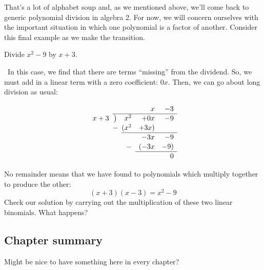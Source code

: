 That's a lot of alphabet soup and, as we mentioned above, we'll come back to generic polynomial division in algebra 2. For now, we will concern ourselves with the important situation in which one polynomial is a factor of another. Consider this final example as we make the transition.

\begin{boxedex}
Divide $x^2-9$ by $x+3$.

\exsoln\ In this case, we find that there are terms ``missing'' from the dividend. So, we must add in a linear term with a zero coefficient: $0x$. Then, we can go about long division as usual:

\[
\renewcommand\arraystretch{1.1}
\begin{array}{*1r @{\hskip\arraycolsep}c@{\hskip\arraycolsep} *3r}
		&	~	&&x&-3\\
\cline{2-5}
x+3	&\big)	&x^2&+0x&-9\\
		&-		&(x^2&+3x)\\
\cline{3-5}
		&		&&-3x&-9\\
		&		&-&(-3x&-9)\\
\cline{4-5}
		&		&&&0
\end{array}
\]

No remainder means that we have found to polynomials which multiply together to produce the other:
\[(x+3)(x-3) = x^2 - 9\]
Check our solution by carrying out the multiplication of these two linear binomials. What happens?
\end{boxedex}

\subsection*{Chapter summary}

Might be nice to have something here in every chapter?
